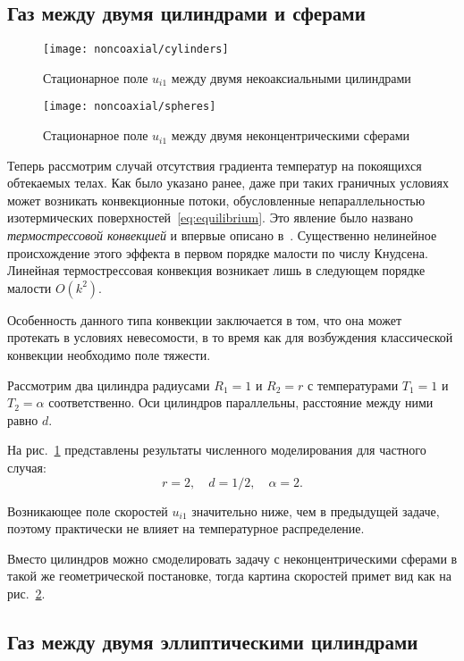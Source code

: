 \documentclass[english,russian,a4paper,10pt]{article}
\begin{document}
\subsection{Газ между двумя цилиндрами и сферами}

\begin{figure}[ht]
	\centering
	\texttt{[image: noncoaxial/cylinders]}
	\caption{Стационарное поле \(u_{i1}\) между двумя некоаксиальными цилиндрами}\label{fig:cylinders}
\end{figure}

\begin{figure}
	\centering
	\texttt{[image: noncoaxial/spheres]}
	\caption{Стационарное поле \(u_{i1}\) между двумя неконцентрическими сферами}\label{fig:spheres}
\end{figure}

Теперь рассмотрим случай отсутствия градиента температур на покоящихся обтекаемых телах.
Как было указано ранее, даже при таких граничных условиях может возникать конвекционные потоки,
обусловленные непараллельностью изотермических поверхностей~\eqref{eq:equilibrium}.
Это явление было названо \textit{термострессовой конвекцией} и впервые описано в~\cite{Kogan1971}.
Существенно нелинейное происхождение этого эффекта в первом порядке малости по числу Кнудсена.
Линейная термострессовая конвекция возникает лишь в следующем порядке малости \(O(k^2)\).

Особенность данного типа конвекции заключается в том, что она может протекать в условиях невесомости,
в то время как для возбуждения классической конвекции необходимо поле тяжести.

Рассмотрим два цилиндра радиусами \(R_1=1\) и \(R_2=r\)
с температурами \(T_1=1\) и \(T_2=\alpha\) соответственно.
Оси цилиндров параллельны, расстояние между ними равно \(d\).

На рис.~\ref{fig:cylinders} представлены результаты численного моделирования для частного случая:
\[ r = 2, \quad d = 1/2, \quad \alpha = 2.\]

Возникающее поле скоростей \(u_{i1}\) значительно ниже, чем в предыдущей задаче,
поэтому практически не влияет на температурное распределение.

Вместо цилиндров можно смоделировать задачу с неконцентрическими сферами в такой же геометрической постановке,
тогда картина скоростей примет вид как на рис.~\ref{fig:spheres}.

\subsection{Газ между двумя эллиптическими цилиндрами}
\end{document}
